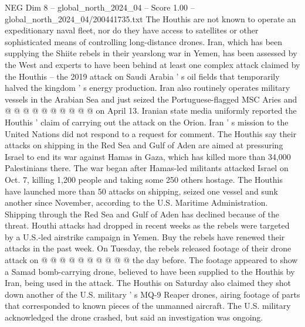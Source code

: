 \begin{textsample}{NEG Dim 8 – global\_north\_2024\_04 – Score 1.00 – global\_north\_2024\_04/200441735.txt}
The Houthis are not known to operate an expeditionary naval fleet, nor do they have access to satellites or other sophisticated means of controlling long-distance drones.
Iran, which has been supplying the Shiite rebels in their yearslong war in Yemen, has been assessed by the West and experts to have been behind at least one complex attack claimed by the Houthis -- the 2019 attack on Saudi Arabia ' s oil fields that temporarily halved the kingdom ' s energy production.
Iran also routinely operates military vessels in the Arabian Sea and just seized the Portuguese-flagged MSC Aries and @ @ @ @ @ @ @ @ @ @ on April 13.
Iranian state media uniformly reported the Houthis ' claim of carrying out the attack on the Orion.
Iran ' s mission to the United Nations did not respond to a request for comment.
The Houthis say their attacks on shipping in the Red Sea and Gulf of Aden are aimed at pressuring Israel to end its war against Hamas in Gaza, which has killed more than 34,000 Palestinians there.
The war began after Hamas-led militants attacked Israel on Oct. 7, killing 1,200 people and taking some 250 others hostage.
The Houthis have launched more than 50 attacks on shipping, seized one vessel and sunk another since November, according to the U.S.
Maritime Administration.
Shipping through the Red Sea and Gulf of Aden has declined because of the threat.
Houthi attacks had dropped in recent weeks as the rebels were targeted by a U.S.-led airstrike campaign in Yemen.
Buy the rebels have renewed their attacks in the past week.
On Tuesday, the rebels released footage of their drone attack on @ @ @ @ @ @ @ @ @ @ the day before.
The footage appeared to show a Samad bomb-carrying drone, believed to have been supplied to the Houthis by Iran, being used in the attack.
The Houthis on Saturday also claimed they shot down another of the U.S. military ' s MQ-9 Reaper drones, airing footage of parts that corresponded to known pieces of the unmanned aircraft.
The U.S. military acknowledged the drone crashed, but said an investigation was ongoing.

\end{textsample}
